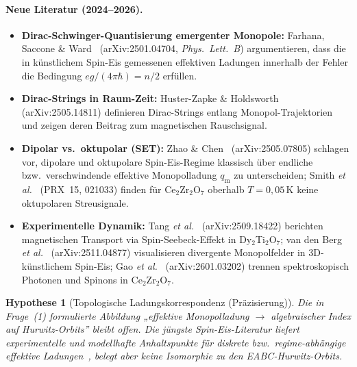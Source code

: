 \documentclass[11pt,a4paper]{article}
\newtheorem{hypothesis}{Hypothese}
\begin{document}
	\paragraph{Neue Literatur (2024--2026).}
	\begin{itemize}
		\item \textbf{Dirac-Schwinger-Quantisierung emergenter Monopole:}
		Farhana, Saccone \& Ward~\cite{ward-farhana-saccone-2025}
		(arXiv:2501.04704, \emph{Phys.\ Lett.\ B}) argumentieren, dass die in
		künstlichem Spin-Eis gemessenen effektiven Ladungen innerhalb der Fehler
		die Bedingung $eg/(4\pi\hbar)=n/2$ erfüllen.
		\item \textbf{Dirac-Strings in Raum-Zeit:}
		Huster-Zapke \& Holdsworth~\cite{huster-holdsworth-2025}
		(arXiv:2505.14811) definieren Dirac-Strings entlang Monopol-Trajektorien
		und zeigen deren Beitrag zum magnetischen Rauschsignal.
		\item \textbf{Dipolar vs.\ oktupolar (SET):}
		Zhao \& Chen~\cite{zhao-chen-2026} (arXiv:2505.07805) schlagen vor,
		dipolare und oktupolare Spin-Eis-Regime klassisch über endliche bzw.\
		verschwindende effektive Monopolladung $q_{\mathrm m}$ zu unterscheiden;
		Smith \emph{et al.}~\cite{smith-gaulin-2025} (PRX~15, 021033) finden
		für Ce$_2$Zr$_2$O$_7$ oberhalb $T=0{,}05$\,K keine oktupolaren Streusignale.
		\item \textbf{Experimentelle Dynamik:}
		Tang \emph{et al.}~\cite{tang-gegenwart-2025} (arXiv:2509.18422) berichten
		magnetischen Transport via Spin-Seebeck-Effekt in Dy$_2$Ti$_2$O$_7$;
		van den Berg \emph{et al.}~\cite{van-den-berg-ladak-2025}
		(arXiv:2511.04877) visualisieren divergente Monopolfelder in 3D-künstlichem
		Spin-Eis; Gao \emph{et al.}~\cite{gao-dai-2026} (arXiv:2601.03202) trennen
		spektroskopisch Photonen und Spinons in Ce$_2$Zr$_2$O$_7$.
	\end{itemize}
	
	\begin{hypothesis}[Topologische Ladungskorrespondenz (Präzisierung)]
		\label{hyp:monopole-winding}
		Die in Frage~(1) formulierte Abbildung „effektive Monopolladung $\to$ algebraischer
		Index auf Hurwitz-Orbits'' bleibt \emph{offen}. Die jüngste Spin-Eis-Literatur
		liefert experimentelle und modellhafte Anhaltspunkte für diskrete bzw.\
		regime-abhängige effektive Ladungen~\cite{zhao-chen-2026,ward-farhana-saccone-2025},
		belegt aber keine Isomorphie zu den EABC-Hurwitz-Orbits.
	\end{hypothesis}
	
\end{document}
